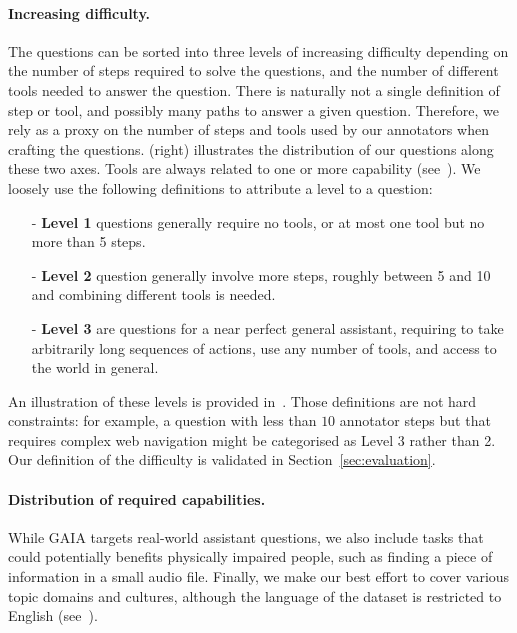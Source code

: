 \documentclass{fairmeta}
\newcommand{\benchmark}{\textsc{GAIA}}
\begin{document}
\vspace{-0.2cm}

\paragraph{Increasing difficulty.} The questions can be sorted into three levels of increasing difficulty depending on the number of steps required to solve the questions, and the number of different tools needed to answer the question. There is naturally not a single definition of step or tool, and possibly many paths to answer a given question. Therefore, we rely as a proxy on the number of steps and tools used by our annotators when crafting the questions.
 (right) illustrates the distribution of our questions along these two axes. Tools are always related to one or more capability (see~). We loosely use the following definitions to attribute a level to a question:
\begin{itemize}
    \item[-] \textbf{Level 1} questions generally require no tools, or at most one tool but no more than 5 steps. 
    \item[-] \textbf{Level 2} question generally involve more steps, roughly between 5 and 10 and combining different tools is needed.
    \item[-] \textbf{Level 3} are questions for a near perfect general assistant, requiring to take arbitrarily long sequences of actions, use any number of tools, and access to the world in general.
\end{itemize}

An illustration of these levels is provided in~. Those definitions are not hard constraints: for example, a question with less than $10$ annotator steps but that requires complex web navigation might be categorised as Level 3 rather than 2. Our definition of the difficulty is validated in Section~\ref{sec:evaluation}.

\paragraph{Distribution of required capabilities.} While \benchmark{} targets real-world assistant questions,
we also include tasks that could potentially benefits physically impaired people, such as finding a piece of information in a small audio file. Finally, we make our best effort to cover various topic domains and cultures, although the language of the dataset is restricted to English (see~). 
\end{document}
